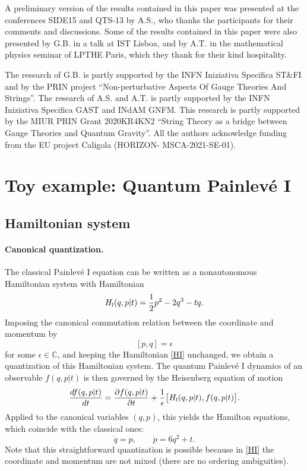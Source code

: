 \documentclass[12pt,a4paper]{article}
\numberwithin{equation}{section}
\newcommand{\I}{\scalebox{.6}{I}}
\begin{document}
A preliminary version of the results contained in this paper was presented at the conferences SIDE15 and QTS-13 by A.S., who thanks the participants for their comments and discussions. Some of the results contained in this paper were also presented by G.B. in a talk at IST Lisboa, 
and by A.T. in the mathematical physics seminar of LPTHE Paris, which they thank for their kind hospitality.

The research of G.B. is partly supported by the INFN Iniziativa Specifica ST\&FI and by the PRIN project “Non-perturbative Aspects Of Gauge Theories And
Strings”. The research of A.S. and A.T. is partly supported by the INFN Iniziativa Specifica GAST and INdAM GNFM. This research is partly supported by the MIUR PRIN
Grant 2020KR4KN2 “String Theory as a bridge between Gauge Theories and Quantum
Gravity”. All the authors acknowledge funding from the EU project Caligola (HORIZON-
MSCA-2021-SE-01).


\section{Toy example: Quantum Painlev\'e I}
\label{sec:toy}
\subsection{Hamiltonian system}
\label{ssec:QPI_Ham}
\paragraph{Canonical quantization.}
The classical Painlev\'e I equation can be written as a nonautonomous Hamiltonian system with Hamiltonian 
\begin{equation}\label{HI}
H_{\I}(q,p|t)=\frac12p^2-2q^3-t q.    
\end{equation}
Imposing the canonical commutation relation between the coordinate and momentum by
\begin{equation}\label{pq_eps}
[p,q]=\epsilon
\end{equation}
for some $\epsilon\in\mathbb{C}$, and keeping the Hamiltonian \eqref{HI} unchanged, we obtain a quantization of this Hamiltonian system. The quantum Painlev\'e I dynamics of an observable $f(q,p|t)$ is then governed by the Heisenberg equation of motion
\begin{equation}\label{Heis_I}
\frac{df(q,p|t)}{dt}=\frac{\partial f(q,p|t)}{\partial t}+\frac1{\epsilon}\big[H_{\I}(q,p|t),f(q,p|t)\big]. 
\end{equation}
Applied to the canonical variables $(q,p)$, this yields the Hamilton equations, which coincide with the classical ones:
\begin{equation}\label{Hameq_I}
\dot{q}=p, \qquad \dot{p}=6q^2+t. 
\end{equation}
Note that this straightforward quantization is possible because in \eqref{HI} the coordinate and momentum are not mixed (there are no ordering ambiguities).
\end{document}
